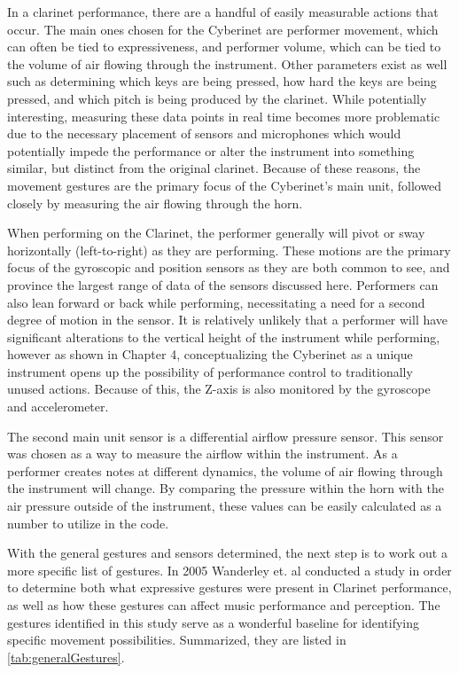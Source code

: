 In a clarinet performance, there are a handful of easily measurable actions that occur. The main ones chosen for the Cyberinet are performer movement, which can often be tied to expressiveness\cite{wanderleyClarinetGesture2005}, and performer volume, which can be tied to the volume of air flowing through the instrument. Other parameters exist as well such as determining which keys are being pressed, how hard the keys are being pressed, and which pitch is being produced by the clarinet. While potentially interesting, measuring these data points in real time becomes more problematic due to the necessary placement of sensors and microphones which would potentially impede the performance or alter the instrument into something similar, but distinct from the original clarinet. Because of these reasons, the movement gestures are the primary focus of the Cyberinet's main unit, followed closely by measuring the air flowing through the horn.

When performing on the Clarinet, the performer generally will pivot or sway horizontally (left-to-right) as they are performing. These motions are the primary focus of the gyroscopic and position sensors as they are both common to see, and province the largest range of data of the sensors discussed here. Performers can also lean forward or back while performing, necessitating a need for a second degree of motion in the sensor. It is relatively unlikely that a performer will have significant alterations to the vertical height of the instrument while performing, however as shown in Chapter 4, conceptualizing the Cyberinet as a unique instrument opens up the possibility of performance control to traditionally unused actions. Because of this, the Z-axis is also monitored by the gyroscope and accelerometer.


The second main unit sensor is a differential airflow pressure sensor. This sensor was chosen as a way to measure the airflow within the instrument. As a performer creates notes at different dynamics, the volume of air flowing through the instrument will change. By comparing the pressure within the horn with the air pressure outside of the instrument, these values can be easily calculated as a number to utilize in the code.

With the general gestures and sensors determined, the next step is to work out a more specific list of gestures. In 2005 Wanderley et. al conducted a study in order to determine both what expressive gestures were present in Clarinet performance, as well as how these gestures can affect music performance and perception\cite{wanderleyClarinetGesture2005}. The gestures identified in this study serve as a wonderful baseline for identifying specific movement possibilities. Summarized, they are listed in \ref{tab:generalGestures}.

